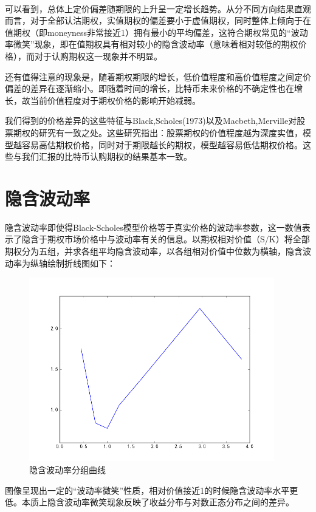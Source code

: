 ~\\
\par{可以看到，总体上定价偏差随期限的上升呈一定增长趋势。从分不同方向结果直观而言，对于全部认沽期权，实值期权的偏差要小于虚值期权，同时整体上倾向于在值期权（即moneyness非常接近1）拥有最小的平均偏差，这符合期权常见的“波动率微笑”现象，即在值期权具有相对较小的隐含波动率（意味着相对较低的期权价格），而对于认购期权这一现象并不明显。}
\par{
还有值得注意的现象是，随着期权期限的增长，低价值程度和高价值程度之间定价偏差的差异在逐渐缩小。即随着时间的增长，比特币未来价格的不确定性也在增长，故当前价值程度对于期权价格的影响开始减弱。
}
\par{
    我们得到的价格差异的这些特征与Black,Scholes(1973)以及Macbeth,Merville对股票期权的研究有一致之处\cite{10.2307/1831029}\cite{Jame-1979}。这些研究指出：股票期权的价值程度越为深度实值，模型越容易高估期权价格，同时对于期限越长的期权，模型越容易低估期权价格。这些与我们汇报的比特币认购期权的结果基本一致。
}   
\section{隐含波动率}
隐含波动率即使得Black-Scholes模型价格等于真实价格的波动率参数，这一数值表示了隐含于期权市场价格中与波动率有关的信息。以期权相对价值（S/K）将全部期权分为五组，并求各组平均隐含波动率，以各组相对价值中位数为横轴，隐含波动率为纵轴绘制折线图如下：
\begin{figure}[H]
\begin{small}
\begin{center}
\includegraphics[width=0.95\textwidth]{figures/mean_isd.png}
\end{center}
\caption{隐含波动率分组曲线}
\label{fig:mean_isd}
\end{small}
\end{figure}
图像呈现出一定的“波动率微笑”性质，相对价值接近1的时候隐含波动率水平更低。本质上隐含波动率微笑现象反映了收益分布与对数正态分布之间的差异。

